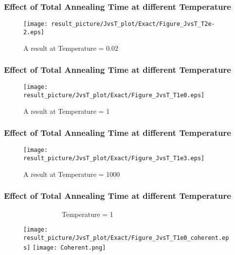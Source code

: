 \documentclass{beamer}
\begin{document}
\begin{frame}
	\frametitle{Effect of Total Annealing Time at different Temperature}
	
	\begin{figure}
		\centering
		\texttt{[image: result\_picture/JvsT\_plot/Exact/Figure\_JvsT\_T2e-2.eps]}
		\caption{A result at Temperature = 0.02}
	\end{figure}
\end{frame}

\begin{frame}
	\frametitle{Effect of Total Annealing Time at different Temperature}
	
	\begin{figure}
		\centering
		\texttt{[image: result\_picture/JvsT\_plot/Exact/Figure\_JvsT\_T1e0.eps]}
		 \caption{A result at Temperature = 1}
	\end{figure}
\end{frame}

\begin{frame}
	\frametitle{Effect of Total Annealing Time at different Temperature}
	
	\begin{figure}
		\centering
		\texttt{[image: result\_picture/JvsT\_plot/Exact/Figure\_JvsT\_T1e3.eps]}
		\caption{A result at Temperature = 1000}
	\end{figure}
\end{frame}
\renewcommand*{\thefootnote}{\fnsymbol{footnote}}
\begin{frame}
	\frametitle{Effect of Total Annealing Time at different Temperature}
	~~~~~~~~~~~~~~~~~Temperature = 1\\
	\begin{figure}
		\centering
		\texttt{[image: result\_picture/JvsT\_plot/Exact/Figure\_JvsT\_T1e0\_coherent.eps]}
		\hfill
		\texttt{[image: Coherent.png]}\footnotemark[1]
	\end{figure}
	
\end{frame}
\end{document}
